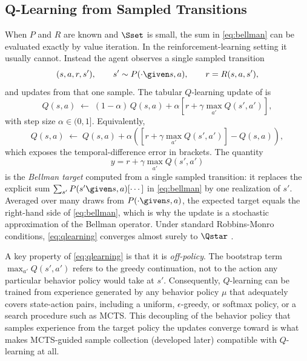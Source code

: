 \subsection{Q-Learning from Sampled Transitions}
\label{sec:background-qlearning}

When $P$ and $R$ are known and $\Sset$ is small, the sum in
\eqref{eq:bellman} can be evaluated exactly by value iteration. In the
reinforcement-learning setting it usually cannot. Instead the agent
observes a single sampled transition
\begin{equation}
(s, a, r, s'), \qquad s' \sim P(\cdot \given s, a), \qquad r = R(s, a, s'),
\label{eq:sample-transition}
\end{equation}
and updates from that one sample. The tabular $Q$-learning update of
\citet{sutton2018reinforcement} is
\begin{equation}
Q(s, a) \;\gets\; (1 - \alpha)\, Q(s, a)
                + \alpha \left[ r + \gamma \max_{a'} Q(s', a') \right],
\label{eq:qlearning}
\end{equation}
with step size $\alpha \in (0, 1]$. Equivalently,
\begin{equation}
Q(s, a) \;\gets\; Q(s, a)
              + \alpha \left( \left[ r + \gamma \max_{a'} Q(s', a') \right]
                              - Q(s, a) \right),
\label{eq:qlearning-error}
\end{equation}
which exposes the temporal-difference error in brackets. The quantity
\begin{equation}
y = r + \gamma \max_{a'} Q(s', a')
\label{eq:bellman-target}
\end{equation}
is the \emph{Bellman target} computed from a single sampled transition: it
replaces the explicit sum $\sum_{s'} P(s' \given s, a)[\cdots]$ in
\eqref{eq:bellman} by one realization of $s'$. Averaged over many draws
from $P(\cdot \given s, a)$, the expected target equals the right-hand
side of \eqref{eq:bellman}, which is why the update is a stochastic
approximation of the Bellman operator. Under standard Robbins-Monro
conditions, \eqref{eq:qlearning} converges almost surely to $\Qstar$
\citep{sutton2018reinforcement}.

A key property of \eqref{eq:qlearning} is that it is \emph{off-policy}.
The bootstrap term $\max_{a'} Q(s', a')$ refers to the greedy
continuation, not to the action any particular behavior policy would take
at $s'$. Consequently, $Q$-learning can be trained from experience
generated by any behavior policy $\mu$ that adequately covers
state-action pairs, including a uniform, $\epsilon$-greedy, or softmax
policy, or a search procedure such as MCTS. This decoupling of the
behavior policy that samples experience from the target policy the
updates converge toward is what makes MCTS-guided sample collection
(developed later) compatible with $Q$-learning at all.

